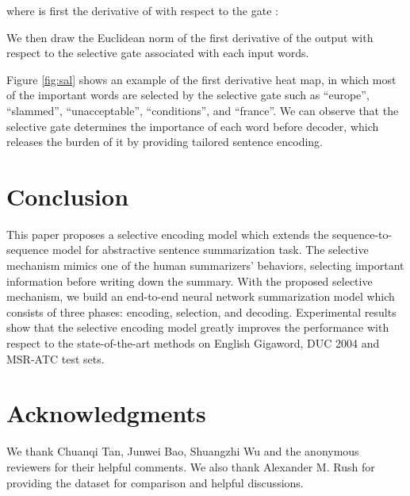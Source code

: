 \documentclass[11pt,a4paper]{article}
\begin{document}
where  is first the derivative of  with respect to the gate :

We then draw the Euclidean norm of the first derivative of the output  with respect to the selective gate  associated with each input words.

Figure \ref{fig:sal} shows an example of the first derivative heat map, in which most of the important words are selected by the selective gate such as ``europe'', ``slammed'', ``unacceptable'', ``conditions'', and ``france''.
We can observe that the selective gate determines the importance of each word before decoder, which releases the burden of it by providing tailored sentence encoding.
 


\section{Conclusion}
This paper proposes a selective encoding model which extends the sequence-to-sequence model for abstractive sentence summarization task.
The selective mechanism mimics one of the human summarizers' behaviors, selecting important information before writing down the summary.
With the proposed selective mechanism, we build an end-to-end neural network summarization model which consists of three phases: encoding, selection, and decoding.
Experimental results show that the selective encoding model greatly improves the performance with respect to the state-of-the-art methods on English Gigaword, DUC 2004 and MSR-ATC test sets.


\section*{Acknowledgments}

We thank Chuanqi Tan, Junwei Bao, Shuangzhi Wu and the anonymous reviewers for their helpful comments.
We also thank Alexander M. Rush for providing the dataset for comparison and helpful discussions.
 


\end{document}
